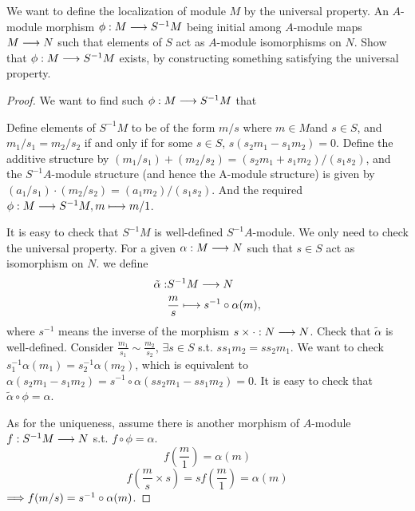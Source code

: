 \documentclass[11pt,fleqn]{book} %
\begin{document}
\begin{exr}
We want to define the localization of module $M$ by the universal property. An $A$-module morphism  $\phi: M\longrightarrow S^{-1}M$ being initial among $A$-module maps $M\longrightarrow N$ such that elements of  $S$ act as $A$-module isomorphisms on $N$.
Show that $\phi:M\longrightarrow S^{-1}M$ exists, by constructing something satisfying the universal property. 
\end{exr}
\begin{proof}
We want to find such $\phi:M\longrightarrow S^{-1}M$ that
\begin{center}
\end{center}
Define elements of $S^{-1}M$ to be of the form $m/s$ where $m\in M$and $s\in S$, and $m_1/s_1 =m_2/s_2$ if and only if for some $s\in S$, $s(s_2m_1 − s_1m_2) = 0$. Define the additive structure by $(m_1/s_1) + (m_2/s_2) = (s_2m_1 + s_1m_2)/(s_1s_2)$, and the $S^{-1}A$-module structure (and hence the A-module structure) is given by$ (a_1/s_1) · (m_2/s_2) = (a_1m_2)/(s_1s_2)$. And the required $\phi:M\longrightarrow S^{-1}M ,m\longmapsto m/1$.

It is easy to check that $S^{-1}M$ is well-defined $S^{-1}A$-module. We only need to check the universal property. For a given $\alpha:M\longrightarrow N$ such that $s\in S$ act as isomorphism on $N$. we define
$$
\begin{aligned}
\tilde{\alpha}:& S^{-1}M\longrightarrow N\\
& \frac{m}{s}\longmapsto s^{-1}\circ\alpha(m),
\end{aligned}
$$
where $s^{-1}$ means the inverse of the morphism $s\times \cdot: N\longrightarrow N$. Check that $\tilde{\alpha}$ is well-defined. Consider $\frac{m_1}{s_1}\sim \frac{m_2}{s_2}$, $\exists s\in S$ s.t. $s s_1m_2=s s_2m_1$. We want to check $s_1^{-1}\alpha(m_1)=s_2^{-1}\alpha(m_2)$, which is equivalent to $\alpha(s_2 m_1-s_1m_2)=s^{-1}\circ \alpha(s s_2m_1-s s_1m_2)=0$.
It is easy to check that $\tilde{\alpha}\circ \phi=\alpha$.

As for the uniqueness, assume there is another morphism of $A$-module $f:S^{-1}M\longrightarrow N$ s.t. $f\circ \phi=\alpha$.
$$
f\left(\frac{m}{1}\right)=\alpha(m)
$$
$$
f\left(\frac{m}{s}\times s\right)=s f\left(\frac{m}{1}\right)=\alpha(m)
$$
$\Longrightarrow f(m/s)=s^{-1}\circ \alpha(m)$.
\end{proof}
\end{document}
